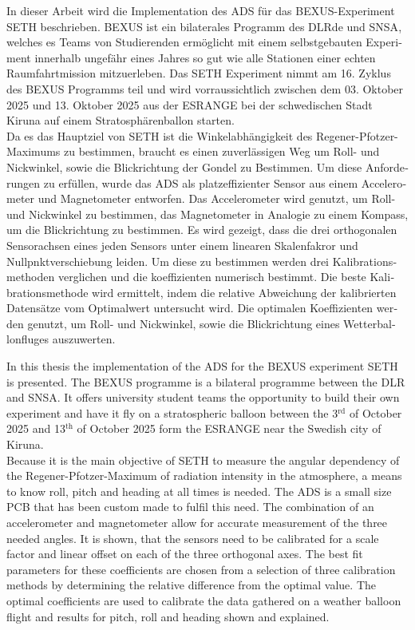 \begin{otherlanguage}{ngerman}
In dieser Arbeit wird die Implementation des \acf{ADS} für das \acs{BEXUS}-Experiment \ac{SETH} beschrieben. \acf{BEXUS} ist ein bilaterales Programm des \acf{DLRde} und \acf{SNSA}, welches es Teams von Studierenden ermöglicht mit einem selbstgebauten Experiment innerhalb ungefähr eines Jahres so gut wie alle Stationen einer echten Raumfahrtmission mitzuerleben. Das \ac{SETH} Experiment nimmt am 16. Zyklus des \ac{BEXUS} Programms teil und wird vorraussichtlich zwischen dem 03. Oktober 2025 und 13. Oktober 2025 aus der \ac{ESRANGE} bei der schwedischen Stadt Kiruna auf einem Stratosphärenballon starten.\\
Da es das Hauptziel von \ac{SETH} ist die Winkelabhängigkeit des Regener-Pfotzer-Maximums zu bestimmen, braucht es einen zuverlässigen Weg um Roll- und Nickwinkel, sowie die Blickrichtung der Gondel zu Bestimmen. Um diese Anforderungen zu erfüllen, wurde das \ac{ADS} als platzeffizienter Sensor aus einem Accelerometer und Magnetometer entworfen. Das Accelerometer wird genutzt, um Roll- und Nickwinkel zu bestimmen, das Magnetometer in Analogie zu einem Kompass, um die Blickrichtung zu bestimmen. Es wird gezeigt, dass die drei orthogonalen Sensorachsen eines jeden Sensors unter einem linearen Skalenfakror und Nullpnktverschiebung leiden. Um diese zu bestimmen werden drei Kalibrationsmethoden verglichen und die koeffizienten numerisch bestimmt. Die beste Kalibrationsmethode wird ermittelt, indem die relative Abweichung der kalibrierten Datensätze vom Optimalwert untersucht wird. Die optimalen Koeffizienten werden genutzt, um Roll- und Nickwinkel, sowie die Blickrichtung eines Wetterballonfluges auszuwerten.
\end{otherlanguage}

In this thesis the implementation of the \acf{ADS} for the \acf{BEXUS} experiment \acf{SETH} is presented. The \acf{BEXUS} programme is a bilateral programme between the \acf{DLR} and \acf{SNSA}. It offers university student teams the opportunity to build their own experiment and have it fly on a stratospheric balloon between the 3$^\mathrm{rd}$ of October 2025 and 13$^\mathrm{th}$ of October 2025 form the \acf{ESRANGE} near the Swedish city of Kiruna.\\ Because it is the main objective of \ac{SETH} to measure the angular dependency of the Regener-Pfotzer-Maximum of radiation intensity in the atmosphere, a means to know roll, pitch and heading at all times is needed. The \ac{ADS} is a small size \acs{PCB} that has been custom made to fulfil this need. The combination of an accelerometer and magnetometer allow for accurate measurement of the three needed angles. It is shown, that the sensors need to be calibrated for a scale factor and linear offset on each of the three orthogonal axes. The best fit parameters for these coefficients are chosen from a selection of three calibration methods by determining the relative difference from the optimal value. The optimal coefficients are used to calibrate the data gathered on a weather balloon flight and results for pitch, roll and heading shown and explained.